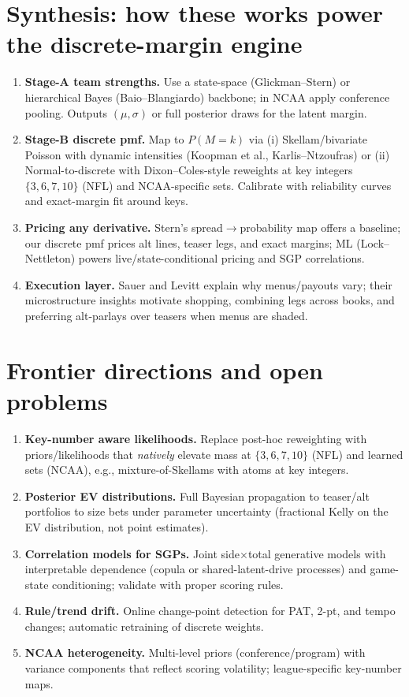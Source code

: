 \documentclass[11pt]{amsart}
\begin{document}
\section{Synthesis: how these works power the discrete-margin engine}
\begin{enumerate}[leftmargin=2em]
\item \textbf{Stage-A team strengths.} Use a state-space (Glickman--Stern) or hierarchical Bayes (Baio--Blangiardo) backbone; in NCAA apply conference pooling. Outputs $(\mu,\sigma)$ or full posterior draws for the latent margin.
\item \textbf{Stage-B discrete pmf.} Map to $P(M=k)$ via (i) Skellam/bivariate Poisson with dynamic intensities (Koopman et al., Karlis--Ntzoufras) or (ii) Normal-to-discrete with Dixon--Coles-style reweights at key integers $\{3,6,7,10\}$ (NFL) and NCAA-specific sets. Calibrate with reliability curves and exact-margin fit around keys.
\item \textbf{Pricing any derivative.} Stern’s spread$\to$probability map offers a baseline; our discrete pmf prices alt lines, teaser legs, and exact margins; ML (Lock--Nettleton) powers live/state-conditional pricing and SGP correlations.
\item \textbf{Execution layer.} Sauer and Levitt explain why menus/payouts vary; their microstructure insights motivate shopping, combining legs across books, and preferring alt-parlays over teasers when menus are shaded.
\end{enumerate}

\section{Frontier directions and open problems}
\begin{enumerate}[leftmargin=2em]
\item \textbf{Key-number aware likelihoods.} Replace post-hoc reweighting with priors/likelihoods that \emph{natively} elevate mass at $\{3,6,7,10\}$ (NFL) and learned sets (NCAA), e.g., mixture-of-Skellams with atoms at key integers.
\item \textbf{Posterior EV distributions.} Full Bayesian propagation to teaser/alt portfolios to size bets under parameter uncertainty (fractional Kelly on the EV distribution, not point estimates).
\item \textbf{Correlation models for SGPs.} Joint side$\times$total generative models with interpretable dependence (copula or shared-latent-drive processes) and game-state conditioning; validate with proper scoring rules.
\item \textbf{Rule/trend drift.} Online change-point detection for PAT, 2-pt, and tempo changes; automatic retraining of discrete weights.
\item \textbf{NCAA heterogeneity.} Multi-level priors (conference/program) with variance components that reflect scoring volatility; league-specific key-number maps.
\end{enumerate}
\end{document}
